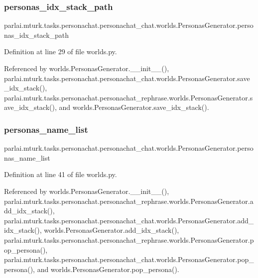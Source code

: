 \subsubsection{\texorpdfstring{personas\+\_\+idx\+\_\+stack\+\_\+path}{personas\_idx\_stack\_path}}
{\footnotesize\ttfamily parlai.\+mturk.\+tasks.\+personachat.\+personachat\+\_\+chat.\+worlds.\+Personas\+Generator.\+personas\+\_\+idx\+\_\+stack\+\_\+path}



Definition at line 29 of file worlds.\+py.



Referenced by worlds.\+Personas\+Generator.\+\_\+\+\_\+init\+\_\+\+\_\+(), parlai.\+mturk.\+tasks.\+personachat.\+personachat\+\_\+chat.\+worlds.\+Personas\+Generator.\+save\+\_\+idx\+\_\+stack(), parlai.\+mturk.\+tasks.\+personachat.\+personachat\+\_\+rephrase.\+worlds.\+Personas\+Generator.\+save\+\_\+idx\+\_\+stack(), and worlds.\+Personas\+Generator.\+save\+\_\+idx\+\_\+stack().

\mbox{\label{classparlai_1_1mturk_1_1tasks_1_1personachat_1_1personachat__chat_1_1worlds_1_1PersonasGenerator_ac31580ffc80d96ba4a04480e1961fdde}} 
\subsubsection{\texorpdfstring{personas\+\_\+name\+\_\+list}{personas\_name\_list}}
{\footnotesize\ttfamily parlai.\+mturk.\+tasks.\+personachat.\+personachat\+\_\+chat.\+worlds.\+Personas\+Generator.\+personas\+\_\+name\+\_\+list}



Definition at line 41 of file worlds.\+py.



Referenced by worlds.\+Personas\+Generator.\+\_\+\+\_\+init\+\_\+\+\_\+(), parlai.\+mturk.\+tasks.\+personachat.\+personachat\+\_\+rephrase.\+worlds.\+Personas\+Generator.\+add\+\_\+idx\+\_\+stack(), parlai.\+mturk.\+tasks.\+personachat.\+personachat\+\_\+chat.\+worlds.\+Personas\+Generator.\+add\+\_\+idx\+\_\+stack(), worlds.\+Personas\+Generator.\+add\+\_\+idx\+\_\+stack(), parlai.\+mturk.\+tasks.\+personachat.\+personachat\+\_\+rephrase.\+worlds.\+Personas\+Generator.\+pop\+\_\+persona(), parlai.\+mturk.\+tasks.\+personachat.\+personachat\+\_\+chat.\+worlds.\+Personas\+Generator.\+pop\+\_\+persona(), and worlds.\+Personas\+Generator.\+pop\+\_\+persona().


